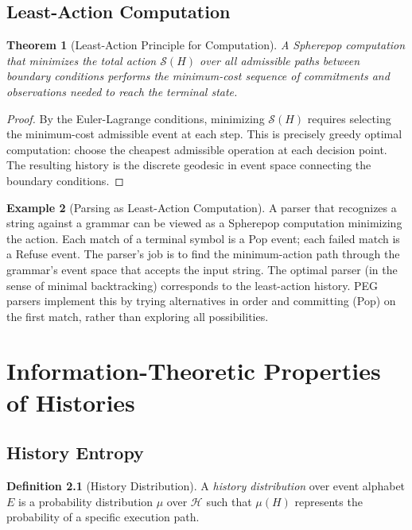 \documentclass[12pt, a4paper, openany]{book}
\theoremstyle{plain}
\newtheorem{theorem}{Theorem}[chapter]
\theoremstyle{definition}
\newtheorem{definition}[theorem]{Definition}
\newtheorem{example}[theorem]{Example}
\theoremstyle{remark}
\newcommand{\calH}{\mathcal{H}}
\begin{document}
\section{Least-Action Computation}

\begin{theorem}[Least-Action Principle for Computation]
A Spherepop computation that minimizes the total action $\mathcal{S}(H)$ over
all admissible paths between boundary conditions performs the minimum-cost
sequence of commitments and observations needed to reach the terminal state.
\end{theorem}

\begin{proof}
By the Euler-Lagrange conditions, minimizing $\mathcal{S}(H)$ requires selecting
the minimum-cost admissible event at each step. This is precisely greedy optimal
computation: choose the cheapest admissible operation at each decision point.
The resulting history is the discrete geodesic in event space connecting the
boundary conditions.
\end{proof}

\begin{example}[Parsing as Least-Action Computation]
A parser that recognizes a string against a grammar can be viewed as a
Spherepop computation minimizing the action. Each match of a terminal symbol
is a Pop event; each failed match is a Refuse event. The parser's job is to
find the minimum-action path through the grammar's event space that accepts
the input string. The optimal parser (in the sense of minimal backtracking)
corresponds to the least-action history. PEG parsers implement this by trying
alternatives in order and committing (Pop) on the first match, rather than
exploring all possibilities.
\end{example}

\chapter{Information-Theoretic Properties of Histories}

\section{History Entropy}

\begin{definition}[History Distribution]
A \emph{history distribution} over event alphabet $E$ is a probability
distribution $\mu$ over $\calH$ such that $\mu(H)$ represents the probability
of a specific execution path.
\end{definition}
\end{document}
